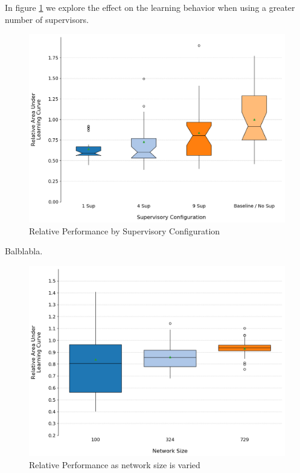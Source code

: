 \documentclass[letterpaper]{article}
\begin{document}
In figure \ref{fig:sups} we explore the effect on the learning behavior when using a greater number of supervisors.
\begin{figure}[ht]
 \begin{center}
  \includegraphics[width=\linewidth]{figures/figure7}
  \caption{Relative Performance by Supervisory Configuration}
  \label{fig:sups}
 \end{center}
\end{figure}

Balblabla.
\begin{figure}[ht]
 \begin{center}
  \includegraphics[width=\linewidth]{figures/figure8}
  \caption{Relative Performance as network size is varied}
  \label{fig:sizes}
 \end{center}
\end{figure}
\end{document}
